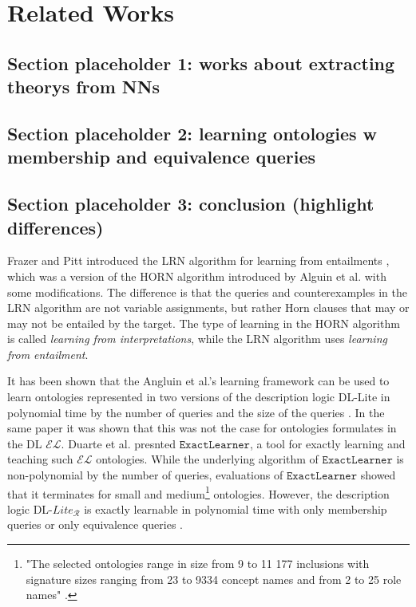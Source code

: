 \chapter{Related Works}

\section{Section placeholder 1: works about extracting theorys from NNs}

\section{Section placeholder 2: learning ontologies w membership and equivalence queries}

\section{Section placeholder 3: conclusion (highlight differences)}

Frazer and Pitt introduced the LRN algorithm for learning from entailments \cite{DBLP:conf/icml/FrazierP93}, which was a version of the HORN algorithm introduced by Alguin et al. \cite{DBLP:journals/ml/AngluinFP92} with some modifications. The difference is that the queries and counterexamples in the LRN algorithm are not variable assignments, but rather Horn clauses that may or may not be entailed by the target. The type of learning in the HORN algorithm is called \emph{learning from interpretations}, while the LRN algorithm uses \emph{learning from entailment}.

It has been shown that the Angluin et al.'s learning framework can be used to learn ontologies represented in two versions of the description logic DL-Lite in polynomial time by the number of queries and the size of the queries \cite{DL_lite}.  In the same paper it was shown that this was not the case for ontologies formulates in the DL $\mathcal{EL}$. Duarte et al. \cite{duarte2018exactlearner} presnted $\texttt{ExactLearner}$, a tool for exactly learning and teaching such $\mathcal{EL}$ ontologies. While the underlying algorithm of $\texttt{ExactLearner}$ is non-polynomial by the number of queries, evaluations of $\texttt{ExactLearner}$ showed that it terminates for small and medium\footnote{"The selected ontologies range in size from 9 to 11 177 inclusions with signature
sizes ranging from 23 to 9334 concept names and from 2 to 25 role names" \cite{duarte2018exactlearner}.} ontologies. However, the description logic DL-$Lite_{\mathcal{R}}$ is exactly learnable in polynomial time with only membership queries or only equivalence queries \cite{Ozaki2020}. 


